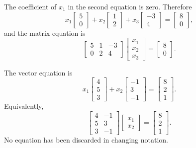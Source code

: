 The coefficient of $x_1$ in the second equation is zero. Therefore
\[x_1\begin{bmatrix}5\\0\end{bmatrix}
+x_2\begin{bmatrix}1\\2\end{bmatrix}
+x_3\begin{bmatrix}-3\\4\end{bmatrix}
=\begin{bmatrix}8\\0\end{bmatrix},\]
and the matrix equation is
\[\begin{bmatrix}5&1&-3\\0&2&4\end{bmatrix}
\begin{bmatrix}x_1\\x_2\\x_3\end{bmatrix}
=\begin{bmatrix}8\\0\end{bmatrix}.\]

The vector equation is
\[x_1\begin{bmatrix}4\\5\\3\end{bmatrix}
+x_2\begin{bmatrix}-1\\3\\-1\end{bmatrix}
=\begin{bmatrix}8\\2\\1\end{bmatrix}.\]
Equivalently,
\[\begin{bmatrix}4&-1\\5&3\\3&-1\end{bmatrix}
\begin{bmatrix}x_1\\x_2\end{bmatrix}
=\begin{bmatrix}8\\2\\1\end{bmatrix}.\]
No equation has been discarded in changing notation.

